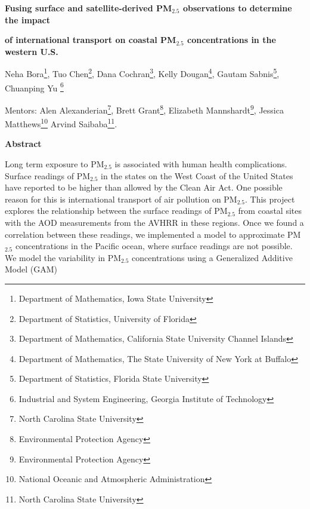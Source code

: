 \documentclass[10pt]{article}
\begin{document}
\centerline{\large \bf Fusing surface and satellite-derived PM$_{2.5}$ observations to determine the impact } 

\centerline{\large \bf of international transport on coastal PM$_{2.5}$ concentrations in the western U.S.}

\vspace{.1truein}

\def\thefootnote{\arabic{footnote}}
\begin{center}
  Neha Bora\footnote{Department of Mathematics, Iowa State University},
  Tuo Chen\footnote{Department of Statistics, University of Florida},
  Dana Cochran\footnote{Department of Mathematics, California State University Channel Islands},
  Kelly Dougan\footnote{Department of Mathematics, The State University of New York at Buffalo},
  Gautam Sabnis\footnote{Department of Statistics, Florida State University},
  Chuanping Yu \footnote{Industrial and System Engineering, Georgia Institute of Technology}
\end{center}


\begin{center}
Mentors: Alen Alexanderian\footnote{North Carolina State University},
Brett Grant\footnote{Environmental Protection Agency},
Elizabeth Mannshardt\footnote{Environmental Protection Agency}, 
Jessica Matthews\footnote{National Oceanic and Atmospheric Administration}
Arvind Saibaba\footnote{North Carolina State University}.

\end{center}


\vspace{.3truein}
\centerline{\bf Abstract}

Long term exposure to PM$_{2.5}$ is associated with human health complications. Surface readings of PM$_{2.5}$ in the states on the West Coast of the United States have reported to be higher than allowed by the Clean Air Act. One possible reason for this is international transport of air pollution on PM$_{2.5}$. This project explores the relationship between the surface readings of PM$_{2.5}$ from coastal sites with the AOD measurements from the AVHRR in these regions. Once we found a correlation between these readings, we implemented a model to approximate PM$_{2.5}$ concentrations in the Pacific ocean, where surface readings are not possible. We model the variability in PM$_{2.5}$ concentrations using a Generalized Additive Model (GAM) 
\end{document}
